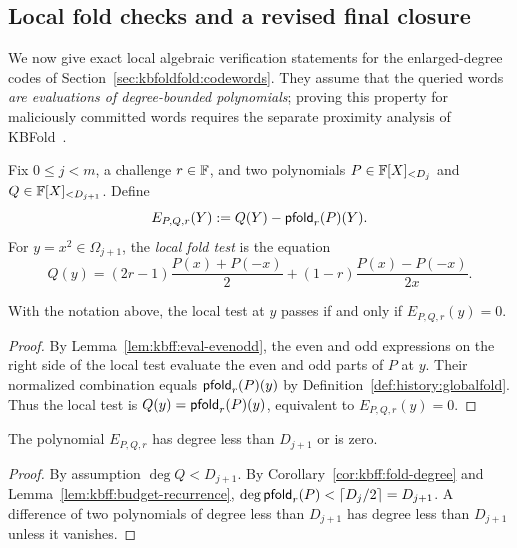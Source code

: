 \subsection{Local fold checks and a revised final closure}\label{sec:kbfoldfold:verification}

We now give exact local algebraic verification statements for the enlarged-degree codes of Section~\ref{sec:kbfoldfold:codewords}. They assume that the queried words \emph{are evaluations of degree-bounded polynomials}; proving this property for maliciously committed words requires the separate proximity analysis of KBFold~\cite{MkhidaKBFold2026}.

\begin{definition}\label{def:kbff:fold-residual}
Fix $0\leq j<m$, a challenge $r\in\mathbb{F}$, and two polynomials
$P\in\mathbb{F}[X]_{<D_j}$ and $Q\in\mathbb{F}[X]_{<D_{j+1}}$. Define
\[
 E_{P,Q,r}(Y):=Q(Y)-\mathsf{pfold}_r(P)(Y).
\]
For $y=x^2\in\Omega_{j+1}$, the \emph{local fold test} is the equation
\[
 Q(y)=
 (2r-1)\frac{P(x)+P(-x)}2
 +(1-r)\frac{P(x)-P(-x)}{2x}.
\]
\end{definition}

\begin{lemma}\label{lem:kbff:local-residual}
With the notation above, the local test at $y$ passes if and only if
$E_{P,Q,r}(y)=0$.
\end{lemma}
\begin{proof}
By Lemma~\ref{lem:kbff:eval-evenodd}, the even and odd expressions on the right side of the local test evaluate the even and odd parts of $P$ at $y$. Their normalized combination equals $\mathsf{pfold}_r(P)(y)$ by Definition~\ref{def:history:globalfold}. Thus the local test is $Q(y)=\mathsf{pfold}_r(P)(y)$, equivalent to $E_{P,Q,r}(y)=0$.
\end{proof}

\begin{lemma}\label{lem:kbff:residual-bound}
The polynomial $E_{P,Q,r}$ has degree less than $D_{j+1}$ or is zero.
\end{lemma}
\begin{proof}
By assumption $\deg Q<D_{j+1}$. By Corollary~\ref{cor:kbff:fold-degree} and Lemma~\ref{lem:kbff:budget-recurrence},
$\deg\mathsf{pfold}_r(P)<\lceil D_j/2\rceil=D_{j+1}$.
A difference of two polynomials of degree less than $D_{j+1}$
has degree less than $D_{j+1}$ unless it vanishes.
\end{proof}

